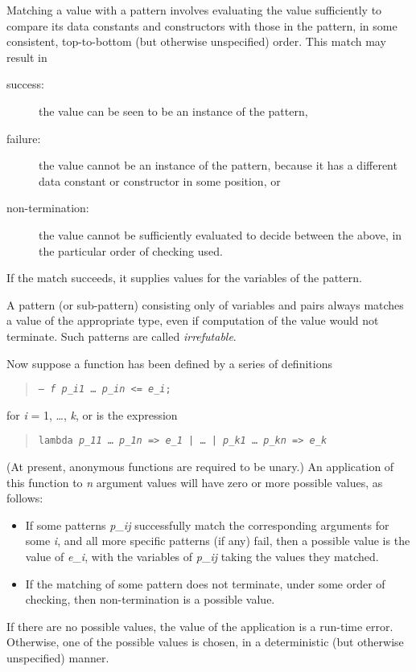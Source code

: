 \documentclass[11pt]{article}
\newcommand{\sub}[2]{#1\_{\Math{#2}}}
\newcommand{\Cdots}{\textrm{\ldots}}
\newcommand{\Math}[1]{\textit{\textmd{\textrm{#1}}}}
\newcommand{\Samp}[1]{\textup{\textmd{\texttt{#1}}}}
\begin{document}
Matching a value with a pattern involves evaluating the value sufficiently
to compare its data constants and constructors with those in the pattern,
in some consistent, top-to-bottom (but otherwise unspecified) order.
This match may result in
\begin{description}
\item[success:]
the value can be seen to be an instance of the pattern,

\item[failure:]
the value cannot be an instance of the pattern,
because it has a different data constant or constructor in some position, or

\item[non-termination:]
the value cannot be sufficiently evaluated to decide between the above,
in the particular order of checking used.
\end{description}
If the match succeeds, it supplies values for the variables of the pattern.

A pattern (or sub-pattern) consisting only of variables and pairs
always matches a value of the appropriate type,
even if computation of the value would not terminate.
Such patterns are called \emph{irrefutable}.

Now suppose a function has been defined by a series of definitions
\begin{quotation}
	\Samp{--- \Math{f} \sub{\Math{p}}{i1} \Cdots{} \sub{\Math{p}}{in} <= \sub{\Math{e}}{i};}
\end{quotation}
for \Math{i} = 1, \ldots, \Math{k},
or is the expression
\begin{quotation}
	\Samp{lambda
	\sub{\Math{p}}{11} \Cdots{} \sub{\Math{p}}{1n} => \sub{\Math{e}}{1}
	| \Cdots{} |
	\sub{\Math{p}}{k1} \Cdots{} \sub{\Math{p}}{kn} => \sub{\Math{e}}{k}
	}
\end{quotation}
(At present, anonymous functions are required to be unary.)
An application of this function to \Math{n} argument values
will have zero or more possible values, as follows:
\begin{itemize}
\item
If some patterns \sub{\Math{p}}{ij}
successfully match the corresponding arguments for some \Math{i},
and all more specific patterns (if any) fail,
then a possible value is the value of \sub{\Math{e}}{i},
with the variables of \sub{\Math{p}}{ij} taking the values they matched.

\item
If the matching of some pattern does not terminate,
under some order of checking,
then non-termination is a possible value.
\end{itemize}
If there are no possible values,
the value of the application is a run-time error.
Otherwise, one of the possible values is chosen,
in a deterministic (but otherwise unspecified) manner.
\end{document}
